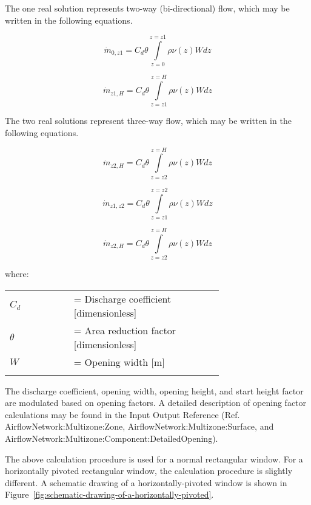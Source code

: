The one real solution represents two-way (bi-directional) flow, which may be written in the following equations.

\begin{equation}
{\dot m_{0,z1}} = {C_d}\theta \int\limits_{z = 0}^{z = z1} {\rho \nu (z)Wdz}
\end{equation}

\begin{equation}
{\dot m_{z1,H}} = {C_d}\theta \int\limits_{z = z1}^{z = H} {\rho \nu (z)Wdz}
\end{equation}

The two real solutions represent three-way flow, which may be written in the following equations.

\begin{equation}
{\dot m_{z2,H}} = {C_d}\theta \int\limits_{z = z2}^{z = H} {\rho \nu (z)Wdz}
\end{equation}

\begin{equation}
{\dot m_{z1,z2}} = {C_d}\theta \int\limits_{z = z1}^{z = z2} {\rho \nu (z)Wdz}
\end{equation}

\begin{equation}
{\dot m_{z2,H}} = {C_d}\theta \int\limits_{z = z2}^{z = H} {\rho \nu (z)Wdz}
\end{equation}

where:

\begin{tabular}{lp{0.7\linewidth}}
\\
$C_d$ &= Discharge coefficient [dimensionless]\\
$\theta$ &= Area reduction factor [dimensionless]\\
$W$ &= Opening width [m]\\
\\
\end{tabular}

The discharge coefficient, opening width, opening height, and start height factor are modulated based on opening factors. A detailed description of opening factor calculations may be found in the Input Output Reference (Ref. AirflowNetwork:Multizone:Zone, AirflowNetwork:Multizone:Surface, and AirflowNetwork:Multizone:Component:DetailedOpening).

The above calculation procedure is used for a normal rectangular window. For a horizontally pivoted rectangular window, the calculation procedure is slightly different. A schematic drawing of a horizontally-pivoted window is shown in Figure~\ref{fig:schematic-drawing-of-a-horizontally-pivoted}.


